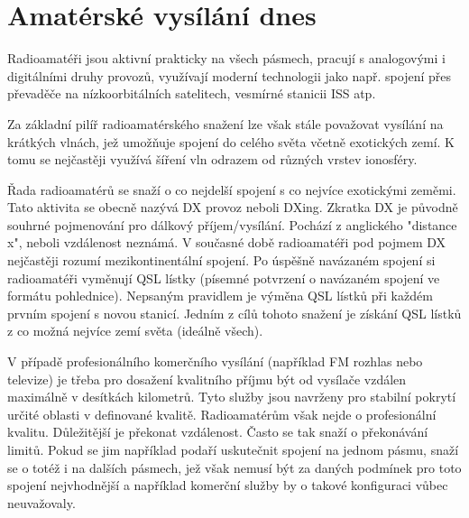 \section{Amatérské vysílání dnes}
\label{radioamateri_dnes}

Radioamatéři jsou aktivní prakticky na všech pásmech, pracují s analogovými i
digitálními druhy provozů, využívají moderní technologii jako např. spojení přes
převaděče na nízkoorbitálních satelitech, vesmírné stanicii ISS atp. 

Za základní pilíř radioamatérského snažení lze však stále považovat vysílání na
krátkých vlnách, jež umožňuje spojení do celého světa včetně exotických zemí. K
tomu se nejčastěji využívá šíření vln odrazem od různých vrstev ionosféry.

Řada radioamatérů se snaží o co nejdelší spojení s co nejvíce exotickými zeměmi.
Tato aktivita se obecně nazývá DX provoz neboli DXing. Zkratka DX je původně souhrné pojmenování
pro dálkový příjem/vysílání. Pochází z anglického "distance
x", neboli vzdálenost neznámá. V současné době radioamatéři pod pojmem DX
nejčastěji rozumí mezikontinentální spojení.
Po úspěšně navázaném spojení si radioamatéři vyměnují QSL lístky (písemné potvrzení o
navázaném spojení ve formátu pohlednice). Nepsaným pravidlem je výměna QSL
lístků při každém prvním spojení s novou stanicí. Jedním z cílů tohoto snažení je
získání QSL lístků z co možná nejvíce zemí světa (ideálně všech).

V případě profesionálního komerčního vysílání (například FM rozhlas nebo
televize) je třeba pro dosažení kvalitního příjmu být od vysílače vzdálen maximálně
v desítkách kilometrů. Tyto služby jsou navrženy pro stabilní pokrytí určité
oblasti v definované kvalitě. Radioamatérům však nejde o profesionální kvalitu.
Důležitější je překonat vzdálenost. Často se tak snaží o překonávání limitů.
Pokud se jim například podaří uskutečnit spojení na jednom pásmu,
snaží se o totéž i na dalších pásmech, jež však nemusí být za daných
podmínek pro toto spojení nejvhodnější a například komerční služby by o takové
konfiguraci vůbec neuvažovaly.


